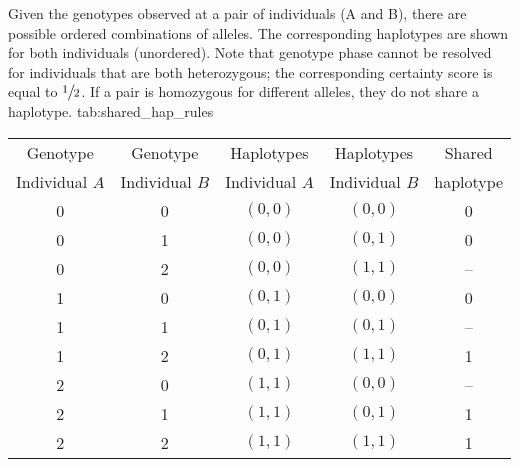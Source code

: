 

\begin{table}[!htb]
{Given the  genotypes observed at a pair of individuals (A and B), there are  possible ordered combinations of alleles.
The corresponding haplotypes are shown for both individuals (unordered).
Note that genotype phase cannot be resolved for individuals that are both heterozygous; \ie the corresponding certainty score is equal to $\large \sfrac{1}{2}$.
If a pair is homozygous for different alleles, they do not share a haplotype.}
{tab:shared_hap_rules}
\centering
\begin{tabular}{ccccc}
\toprule
Genotype & Genotype &  Haplotypes & Haplotypes & Shared  \\
Individual $A$ & Individual $B$ &  Individual $A$ & Individual $B$ & haplotype  \\
\midrule
0  &  0  &  $(0,0)$  &  $(0,0)$  &  0  \\
0  &  1  &  $(0,0)$  &  $(0,1)$  &  0  \\
0  &  2  &  $(0,0)$  &  $(1,1)$  &  -- \\
1  &  0  &  $(0,1)$  &  $(0,0)$  &  0  \\
1  &  1  &  $(0,1)$  &  $(0,1)$  &  -- \\
1  &  2  &  $(0,1)$  &  $(1,1)$  &  1  \\
2  &  0  &  $(1,1)$  &  $(0,0)$  &  -- \\
2  &  1  &  $(1,1)$  &  $(0,1)$  &  1  \\
2  &  2  &  $(1,1)$  &  $(1,1)$  &  1  \\
\bottomrule
\end{tabular}
\end{table}
